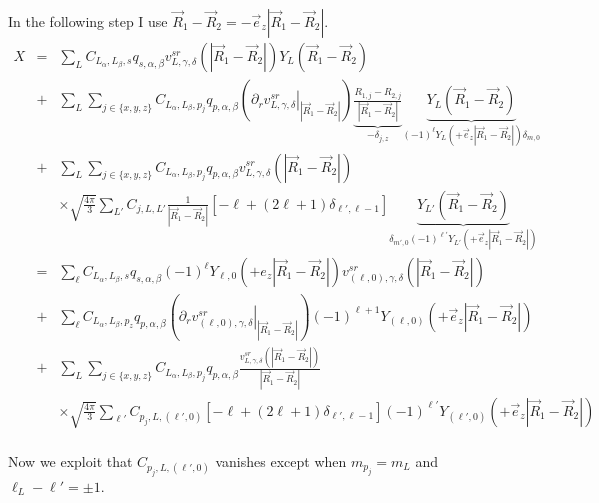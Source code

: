 \documentclass[11pt,a4paper]{report}
\begin{document}
In the following step I use
$\vec{R}_1-\vec{R}_2=-\vec{e}_z|\vec{R}_1-\vec{R}_2|$.
\begin{eqnarray}
X
&=&\sum_LC_{L_\alpha,L_\beta,s}q_{s,\alpha,\beta}
v^{sr}_{L,\gamma,\delta}(|\vec{R}_1-\vec{R}_2|)Y_L(\vec{R}_1-\vec{R}_2)
\nonumber\\
%
&+&\sum_L \sum_{j\in \{x,y,z\}} C_{L_\alpha,L_\beta,p_j}q_{p,\alpha,\beta}
\left(\left.\partial_rv^{sr}_{L,\gamma,\delta}\right|_{|\vec{R}_1-\vec{R}_2|}\right)
\underbrace{\frac{R_{1,j}-R_{2,j}}{|\vec{R}_1-\vec{R}_2|}}_{-\delta_{j,z}}
\underbrace{Y_L(\vec{R}_1-\vec{R}_2)}_{(-1)^\ell Y_L(+\vec{e}_z|\vec{R}_1-\vec{R}_2|)\delta_{m,0}}
\nonumber\\
%
&+&\sum_L \sum_{j\in \{x,y,z\}} C_{L_\alpha,L_\beta,p_j}q_{p,\alpha,\beta}
v^{sr}_{L,\gamma,\delta}(|\vec{R}_1-\vec{R}_2|)
\nonumber\\
%
&&
\times
\sqrt{\frac{4\pi}{3}}\sum_{L'}
C_{j,L,L'}\frac{1}{|\vec{R}_1-\vec{R}_2|}
\left[-\ell+(2\ell+1)\delta_{\ell',\ell-1}\right]
\underbrace{
Y_{L'}(\vec{R}_1-\vec{R}_2)
}_{\delta_{m',0}(-1)^{\ell'}Y_{L'}(+\vec{e}_z|\vec{R}_1-\vec{R}_2|)}
\nonumber\\
%
%
%
&=&\sum_{\ell}
C_{L_\alpha,L_\beta,s}
q_{s,\alpha,\beta}(-1)^\ell Y_{\ell,0}(+e_z|\vec{R}_1-\vec{R}_2|)
v^{sr}_{(\ell,0),\gamma,\delta}(|\vec{R}_1-\vec{R}_2|)
\nonumber\\
%
&+&\sum_\ell C_{L_\alpha,L_\beta,p_z}q_{p,\alpha,\beta}
\left(\left.\partial_rv^{sr}_{(\ell,0),\gamma,\delta}\right|_{|\vec{R}_1-\vec{R}_2|}\right)
(-1)^{\ell+1}Y_{(\ell,0)}(+\vec{e}_z|\vec{R}_1-\vec{R}_2|)
\nonumber\\
%
&+&\sum_L \sum_{j\in \{x,y,z\}} C_{L_\alpha,L_\beta,p_j}q_{p,\alpha,\beta}
\frac{v^{sr}_{L,\gamma,\delta}(|\vec{R}_1-\vec{R}_2|)}{|\vec{R}_1-\vec{R}_2|}
\nonumber\\
&&
\times
\sqrt{\frac{4\pi}{3}}\sum_{\ell'}
C_{p_j,L,(\ell',0)}
\left[-\ell+(2\ell+1)\delta_{\ell',\ell-1}\right]
(-1)^{\ell'}Y_{(\ell',0)}(+\vec{e}_z|\vec{R}_1-\vec{R}_2|)
\nonumber\\
\end{eqnarray}

Now we exploit that $C_{p_j,L,(\ell',0)}$ vanishes except when
$m_{p_j}=m_L$ and $\ell_L-\ell'=\pm1$.
\end{document}
